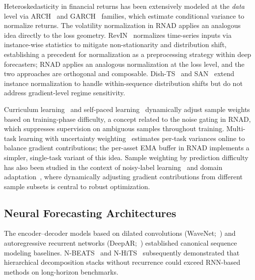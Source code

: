 \documentclass[11pt]{article}
\newcommand{\RNAD}{RNAD\xspace}
\begin{document}
Heteroskedasticity in financial returns has been extensively modeled
at the \emph{data} level via ARCH~\citep{engle1982autoregressive} and
GARCH~\citep{bollerslev1986generalized} families, which estimate
conditional variance to normalize returns. The volatility
normalization in \RNAD applies an analogous idea directly to the loss
geometry. RevIN~\citep{kim2022reversible} normalizes time-series inputs
via instance-wise statistics to mitigate non-stationarity and
distribution shift, establishing a precedent for normalization as a
preprocessing strategy within deep forecasters; \RNAD applies an
analogous normalization at the loss level, and the two approaches are
orthogonal and composable. Dish-TS~\citep{fan2023dish} and
SAN~\citep{liu2024adaptive} extend instance normalization to handle
within-sequence distribution shifts but do not address gradient-level
regime sensitivity.

Curriculum learning~\citep{bengio2009curriculum} and self-paced
learning~\citep{kumar2010self} dynamically adjust sample weights based
on training-phase difficulty, a concept related to the noise gating
in \RNAD, which suppresses supervision on ambiguous samples throughout
training. Multi-task learning with uncertainty
weighting~\citep{kendall2018multi} estimates per-task variances online
to balance gradient contributions; the per-asset EMA buffer in \RNAD
implements a simpler, single-task variant of this idea. Sample
weighting by prediction difficulty has also been studied in the
context of noisy-label learning~\citep{ren2018learning} and domain
adaptation~\citep{ganin2016domain}, where dynamically adjusting
gradient contributions from different sample subsets is central to
robust optimization.

\subsection{Neural Forecasting Architectures}

The encoder--decoder models based on dilated convolutions
(WaveNet;~\citealt{oord2016wavenet}) and autoregressive recurrent
networks (DeepAR;~\citealt{salinas2020deepar}) established canonical
sequence modeling baselines. N-BEATS~\citep{oreshkin2020nbeats} and
N-HiTS~\citep{challu2023nhits} subsequently demonstrated that
hierarchical decomposition stacks without recurrence could exceed
RNN-based methods on long-horizon benchmarks.
\end{document}
